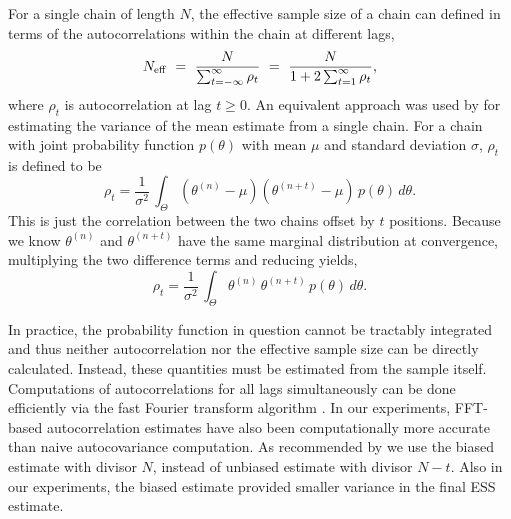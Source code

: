 \documentclass[american,]{article}
\theoremstyle{definition}
\begin{document}

For a single chain of length $N$, the effective sample size of a
chain can defined in terms of the autocorrelations within the chain at
different lags,
\begin{equation}
N_{\rm eff} \ = \
\frac{N}{\sum_{t = -\infty}^{\infty} \rho_t} \ = \
\frac{N}{1 + 2 \sum_{t = 1}^{\infty} \rho_t},
\end{equation}
where \(\rho_t\) is autocorrelation at lag \(t \geq 0\).  An
equivalent approach was used by \citet{Hastings:1970} for
estimating the variance of the mean estimate from a single chain. For a chain
with joint probability function \(p(\theta)\) with mean \(\mu\) and
standard deviation \(\sigma\), \(\rho_t\) is defined to be
\begin{equation}
\rho_t = \frac{1}{\sigma^2} \, \int_{\Theta} (\theta^{(n)} - \mu)
(\theta^{(n+t)} - \mu) \, p(\theta) \, d \theta.
\end{equation}
This is just the correlation between the two chains offset by \(t\)
positions. Because we know \(\theta^{(n)}\) and \(\theta^{(n+t)}\) have
the same marginal distribution at convergence, multiplying the two
difference terms and reducing yields,
\begin{equation}
\rho_t = \frac{1}{\sigma^2} \, \int_{\Theta} \theta^{(n)} \, \theta^{(n+t)}
\, p(\theta) \, d \theta.
\end{equation}

In practice, the probability function in question cannot be tractably
integrated and thus neither autocorrelation nor the effective sample
size can be directly calculated. Instead, these quantities must be
estimated from the sample itself.
%
Computations of autocorrelations for all lags simultaneously can be
done efficiently via the fast Fourier transform algorithm \citep[FFT;
see][]{Geyer:2011}. In our experiments, FFT-based autocorrelation
estimates have also been computationally more accurate than naive
autocovariance computation. As recommended by \citet{Geyer:1992} we
use the biased estimate with divisor $N$, instead of unbiased
estimate with divisor $N-t$. Also in our experiments, the biased
estimate provided smaller variance in the final ESS estimate.
\end{document}
